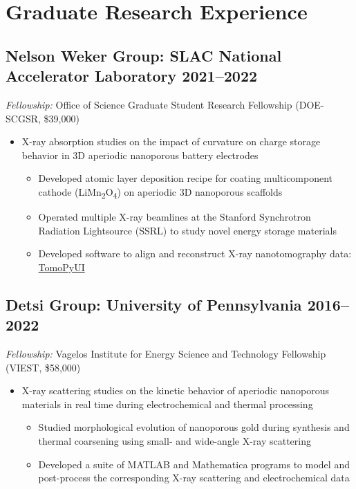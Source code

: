 \documentclass[11pt]{article} %
\begin{document}
\section{Graduate Research Experience}

\subsection{Nelson Weker Group: SLAC National Accelerator Laboratory \hspace*{\fill} 2021--2022}
\begin{flushleft}
  \textit{Fellowship:} Office of Science Graduate Student Research Fellowship (DOE-SCGSR, \$39,000)
\end{flushleft}
\begin{itemize}
  \item X-ray absorption studies on the impact of curvature on charge storage behavior in 3D aperiodic nanoporous battery electrodes
    \begin{itemize}
      \item Developed atomic layer deposition recipe for coating multicomponent cathode (LiMn\textsubscript{2}O\textsubscript{4}) on aperiodic 3D nanoporous scaffolds
      \item Operated multiple X-ray beamlines at the Stanford Synchrotron Radiation Lightsource (SSRL) to study novel energy storage materials
      \item Developed software to align and reconstruct X-ray nanotomography data: \href{https://onlinelibrary.wiley.com/iucr/doi/10.1107/S1600577524003989}{TomoPyUI}
    \end{itemize}

\end{itemize}

\subsection{Detsi Group: University of Pennsylvania \hspace*{\fill} 2016--2022}
\begin{flushleft}
  \textit{Fellowship:} Vagelos Institute for Energy Science and Technology Fellowship (VIEST, \$58,000)
\end{flushleft}
\begin{itemize}
  \item X-ray scattering studies on the kinetic behavior of aperiodic nanoporous materials in real time during electrochemical and thermal processing
    \begin{itemize}
      \item Studied morphological evolution of nanoporous gold during synthesis and thermal coarsening using small- and wide-angle X-ray scattering
      \item Developed a suite of MATLAB and Mathematica programs to model and post-process the corresponding X-ray scattering and electrochemical data
    \end{itemize}
\end{itemize}
\end{document}
